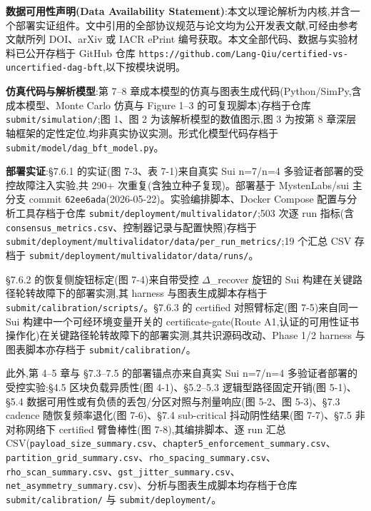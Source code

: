 \documentclass[UTF8,fontset=windows,a4paper,11pt]{ctexart}
\begin{document}
\textbf{数据可用性声明(Data Availability
Statement)}:本文以理论解析为内核,并含一个部署实证组件。文中引用的全部协议规范与论文均为公开发表文献,可经由参考文献所列
DOI、arXiv 或 IACR ePrint 编号获取。本文全部代码、数据与实验材料已公开存档于
GitHub 仓库
\texttt{https://\allowbreak{}github.com/\allowbreak{}Lang-Qiu/\allowbreak{}certified-vs-uncertified-dag-bft},以下按模块说明。

\textbf{仿真代码与解析模型}:第 7--8
章成本模型的仿真与图表生成代码(Python/SimPy,含成本模型、Monte Carlo 仿真与
Figure 1--3 的可复现脚本)存档于仓库
\texttt{submit/\allowbreak{}simulation/\allowbreak{}};图 1、图 2
为该解析模型的数值图示,图 3 为按第 8
章深层轴框架的定性定位,均非真实协议实测。形式化模型代码存档于
\texttt{submit/\allowbreak{}model/\allowbreak{}dag\_\allowbreak{}bft\_\allowbreak{}model.py}。

\textbf{部署实证}:§7.6.1 的实证(图 7-3、表
7-1)来自真实 Sui n=7/n=4 多验证者部署的受控故障注入实验,共 290+
次重复(含独立种子复现)。部署基于 MystenLabs/sui 主分支 commit
\texttt{62ee6ada}(2026-05-22)。实验编排脚本、Docker Compose 配置与分析工具存档于仓库
\texttt{submit/\allowbreak{}deployment/\allowbreak{}multivalidator/\allowbreak{}};503 次逐 run
指标(含 \texttt{consensus\_metrics.csv}、控制器记录与配置快照)存档于
\texttt{submit/\allowbreak{}deployment/\allowbreak{}multivalidator/\allowbreak{}data/\allowbreak{}per\_\allowbreak{}run\_\allowbreak{}metrics/\allowbreak{}};19
个汇总 CSV 存档于
\texttt{submit/\allowbreak{}deployment/\allowbreak{}multivalidator/\allowbreak{}data/\allowbreak{}runs/\allowbreak{}}。

§7.6.2 的恢复侧旋钮标定(图
7-4)来自带受控 $\Delta$\_recover 旋钮的 Sui
构建在关键路径轮转故障下的部署实测,其 harness 与图表生成脚本存档于
\texttt{submit/\allowbreak{}calibration/\allowbreak{}scripts/\allowbreak{}}。§7.6.3 的
certified 对照臂标定(图 7-5)来自同一 Sui 构建中一个可经环境变量开关的
certificate-gate(Route
A1,认证的可用性证书操作化)在关键路径轮转故障下的部署实测,其共识源码改动、Phase
1/2 harness 与图表脚本亦存档于
\texttt{submit/\allowbreak{}calibration/\allowbreak{}}。

此外,第 4--5 章与
§7.3--7.5 的部署锚点亦来自真实 Sui n=7/n=4 多验证者部署的受控实验:§4.5
区块负载异质性(图 4-1)、§5.2--5.3 逻辑型路径固定开销(图 5-1)、§5.4
数据可用性或有负债的丢包/分区对照与剂量响应(图 5-2、图 5-3)、§7.3
cadence 随恢复频率退化(图 7-6)、§7.4 sub-critical 抖动阴性结果(图
7-7)、§7.5 非对称网络下 certified 臂鲁棒性(图 7-8),其编排脚本、逐 run
汇总 CSV(\texttt{payload\_size\_summary.csv}、\texttt{chapter5\_enforcement\_summary.csv}、\texttt{partition\_grid\_summary.csv}、\texttt{rho\_spacing\_summary.csv}、\texttt{rho\_scan\_summary.csv}、\texttt{gst\_jitter\_summary.csv}、\texttt{net\_asymmetry\_summary.csv})、分析与图表生成脚本均存档于仓库
\texttt{submit/\allowbreak{}calibration/\allowbreak{}} 与
\texttt{submit/\allowbreak{}deployment/\allowbreak{}}。
\end{document}
